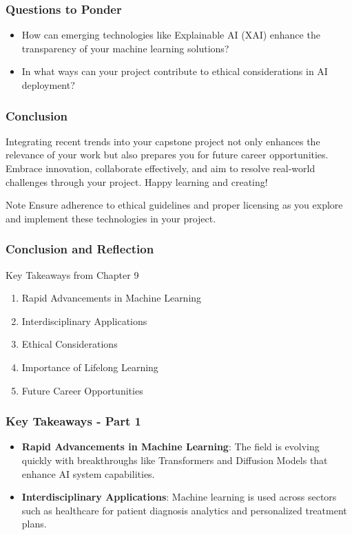 \documentclass[aspectratio=169]{beamer}
\begin{document}
\begin{frame}[fragile]
    \frametitle{Questions to Ponder}
    \begin{itemize}
        \item How can emerging technologies like Explainable AI (XAI) enhance the transparency of your machine learning solutions?
        \item In what ways can your project contribute to ethical considerations in AI deployment?
    \end{itemize}
\end{frame}

\begin{frame}[fragile]
    \frametitle{Conclusion}
    Integrating recent trends into your capstone project not only enhances the relevance of your work but also prepares you for future career opportunities. 
    Embrace innovation, collaborate effectively, and aim to resolve real-world challenges through your project. 
    Happy learning and creating!
    
    \begin{block}{Note}
        Ensure adherence to ethical guidelines and proper licensing as you explore and implement these technologies in your project.
    \end{block}
\end{frame}

\begin{frame}[fragile]
    \frametitle{Conclusion and Reflection}
    \begin{block}{Key Takeaways from Chapter 9}
        \begin{enumerate}
            \item Rapid Advancements in Machine Learning
            \item Interdisciplinary Applications
            \item Ethical Considerations
            \item Importance of Lifelong Learning
            \item Future Career Opportunities
        \end{enumerate}
    \end{block}
\end{frame}

\begin{frame}[fragile]
    \frametitle{Key Takeaways - Part 1}
    \begin{itemize}
        \item \textbf{Rapid Advancements in Machine Learning}: 
        The field is evolving quickly with breakthroughs like Transformers and Diffusion Models that enhance AI system capabilities.
        
        \item \textbf{Interdisciplinary Applications}:
        Machine learning is used across sectors such as healthcare for patient diagnosis analytics and personalized treatment plans.
    \end{itemize}
\end{frame}
\end{document}
